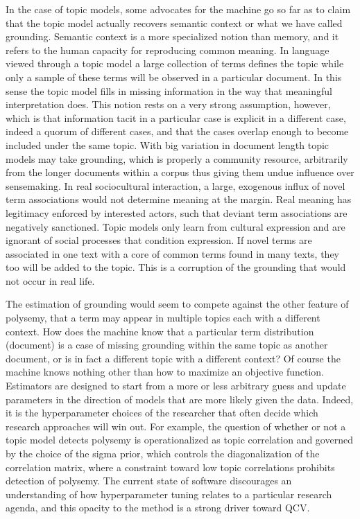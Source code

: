 \documentclass[]{book}
\theoremstyle{definition}
\theoremstyle{definition}
\theoremstyle{definition}
\theoremstyle{remark}
\begin{document}
In the case of topic models, some advocates for the machine go so far as
to claim that the topic model actually recovers semantic context
\citep[578]{DiMaggio2013Exploiting} or what we have called grounding.
Semantic context is a more specialized notion than memory, and it refers
to the human capacity for reproducing common meaning. In language viewed
through a topic model a large collection of terms defines the topic
while only a sample of these terms will be observed in a particular
document. In this sense the topic model fills in missing information in
the way that meaningful interpretation does. This notion rests on a very
strong assumption, however, which is that information tacit in a
particular case is explicit in a different case, indeed a quorum of
different cases, and that the cases overlap enough to become included
under the same topic. With big variation in document length topic models
may take grounding, which is properly a community resource, arbitrarily
from the longer documents within a corpus thus giving them undue
influence over sensemaking. In real sociocultural interaction, a large,
exogenous influx of novel term associations would not determine meaning
at the margin. Real meaning has legitimacy enforced by interested
actors, such that deviant term associations are negatively sanctioned.
Topic models only learn from cultural expression and are ignorant of
social processes that condition expression. If novel terms are
associated in one text with a core of common terms found in many texts,
they too will be added to the topic. This is a corruption of the
grounding that would not occur in real life.

The estimation of grounding would seem to compete against the other
feature of polysemy, that a term may appear in multiple topics each with
a different context. How does the machine know that a particular term
distribution (document) is a case of missing grounding within the same
topic as another document, or is in fact a different topic with a
different context? Of course the machine knows nothing other than how to
maximize an objective function. Estimators are designed to start from a
more or less arbitrary guess and update parameters in the direction of
models that are more likely given the data. Indeed, it is the
hyperparameter choices of the researcher that often decide which
research approaches will win out. For example, the question of whether
or not a topic model detects polysemy is operationalized as topic
correlation and governed by the choice of the sigma prior, which
controls the diagonalization of the correlation matrix, where a
constraint toward low topic correlations prohibits detection of
polysemy. The current state of software discourages an understanding of
how hyperparameter tuning relates to a particular research agenda, and
this opacity to the method is a strong driver toward QCV.
\end{document}
